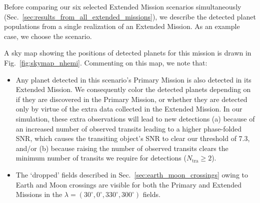 Before comparing our six selected Extended Mission scenarios simultaneously (Sec.~\ref{sec:results_from_all_extended_missions}), we describe the detected planet populations from a single realization of an Extended Mission.
As an example case, we choose the \nhemi\:scenario.

A sky map showing the positions of detected planets for this mission is drawn in Fig.~\ref{fig:skymap_nhemi}.
Commenting on this map, we note that:
\begin{itemize}
	\item Any planet detected in this scenario's Primary Mission is also detected in its Extended Mission.
	We consequently color the detected planets depending on if they are discovered in the Primary Mission, or whether they are detected only by virtue of the extra data collected in the Extended Mission.
	In our simulation, these extra observations will lead to new detections (a) because of an increased number of observed transits leading to a higher phase-folded SNR, which causes the transiting object's SNR to clear our threshold of 7.3, and/or (b) because raising the number of observed transits clears the minimum number of transits we require for detections ($N_\mathrm{tra} \geq 2$).
	\item The `dropped' fields described in Sec.~\ref{sec:earth_moon_crossings} owing to Earth and Moon crossings are visible for both the Primary and Extended Missions in the $\lambda=(30^\circ, 0^\circ, 330^\circ, 300^\circ)$ fields.
\end{itemize}

